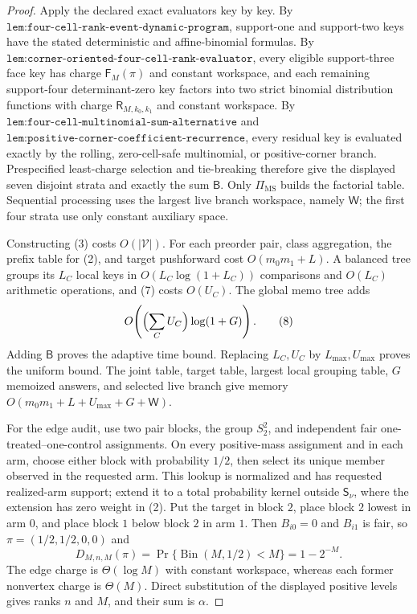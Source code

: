 \documentclass{article}
\begin{document}
\begin{proof}
Apply the declared exact evaluators key by key. By \(\texttt{lem:four-cell-rank-event-dynamic-program}\), support-one and support-two keys have the stated deterministic and affine-binomial formulas. By \(\texttt{lem:corner-oriented-four-cell-rank-evaluator}\), every eligible support-three face key has charge \(\mathsf F_M(\pi)\) and constant workspace, and each remaining support-four determinant-zero key factors into two strict binomial distribution functions with charge \(\mathsf R_{M,k_0,k_1}\) and constant workspace. By \(\texttt{lem:four-cell-multinomial-sum-alternative}\) and \(\texttt{lem:positive-corner-coefficient-recurrence}\), every residual key is evaluated exactly by the rolling, zero-cell-safe multinomial, or positive-corner branch. Prespecified least-charge selection and tie-breaking therefore give the displayed seven disjoint strata and exactly the sum \(\mathsf B\). Only \(\Pi_{\mathrm{MS}}\) builds the factorial table. Sequential processing uses the largest live branch workspace, namely \(\mathsf W\); the first four strata use only constant auxiliary space.

Constructing (3) costs \(O(|\mathcal V|)\). For each preorder pair, class aggregation, the prefix table for (2), and target pushforward cost \(O(m_0m_1+L)\). A balanced tree groups its \(L_C\) local keys in \(O(L_C\log(1+L_C))\) comparisons and \(O(L_C)\) arithmetic operations, and (7) costs \(O(U_C)\). The global memo tree adds
\[
O\!\left(\Bigl(\sum_CU_C\Bigr)\log(1+G)\right).
\tag{8}
\]
Adding \(\mathsf B\) proves the adaptive time bound. Replacing \(L_C,U_C\) by \(L_{\max},U_{\max}\) proves the uniform bound. The joint table, target table, largest local grouping table, \(G\) memoized answers, and selected live branch give memory \(O(m_0m_1+L+U_{\max}+G+\mathsf W)\).

For the edge audit, use two pair blocks, the group \(S_2^2\), and independent fair one-treated--one-control assignments. On every positive-mass assignment and in each arm, choose either block with probability \(1/2\), then select its unique member observed in the requested arm. This lookup is normalized and has requested realized-arm support; extend it to a total probability kernel outside \(\mathsf S_\nu\), where the extension has zero weight in (2). Put the target in block \(2\), place block \(2\) lowest in arm \(0\), and place block \(1\) below block \(2\) in arm \(1\). Then \(B_{i0}=0\) and \(B_{i1}\) is fair, so \(\pi=(1/2,1/2,0,0)\) and
\[
D_{M,n,M}(\pi)=\Pr\{\operatorname{Bin}(M,1/2)<M\}=1-2^{-M}.
\tag{9}
\]
The edge charge is \(\Theta(\log M)\) with constant workspace, whereas each former nonvertex charge is \(\Theta(M)\). Direct substitution of the displayed positive levels gives ranks \(n\) and \(M\), and their sum is \(\alpha\).


\end{proof}
\end{document}
